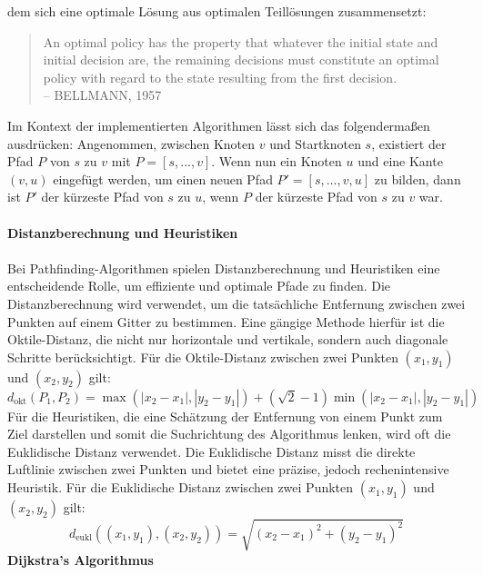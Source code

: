 \begin{itemize}
    dem sich eine optimale Lösung aus optimalen Teillösungen zusammensetzt:
    \begin{quotation}
    An optimal policy has the property that whatever the initial state and initial decision are, the remaining decisions
    must constitute an optimal policy with regard to the state resulting from the first decision.\\
    -- BELLMANN, 1957 \cite{bellman2010}
    \end{quotation}
    Im Kontext der implementierten Algorithmen lässt sich das folgendermaßen ausdrücken:
    Angenommen, zwischen Knoten $v$ und Startknoten $s$, existiert der Pfad $P$ von $s$ zu $v$ mit $P = [s, \dots, v]$.
    Wenn nun ein Knoten $u$ und eine Kante $(v, u)$ eingefügt werden, um einen neuen Pfad $P' = [s, \dots, v, u]$ zu
    bilden, dann ist $P'$ der kürzeste Pfad von $s$ zu $u$, wenn $P$ der kürzeste Pfad von $s$ zu $v$ war. \\\\
    \textbf{Distanzberechnung und Heuristiken}\\\\
    Bei Pathfinding-Algorithmen spielen Distanzberechnung und Heuristiken eine entscheidende Rolle, um effiziente und optimale Pfade zu finden.
    Die Distanzberechnung wird verwendet, um die tatsächliche Entfernung zwischen zwei Punkten auf einem Gitter zu bestimmen.
    Eine gängige Methode hierfür ist die Oktile-Distanz, die nicht nur horizontale und vertikale, sondern auch diagonale Schritte berücksichtigt.
    Für die Oktile-Distanz zwischen zwei Punkten $(x_1, y_1)$ und $(x_2, y_2)$ gilt:
    \begin{equation}
        \label{eq:distance_octile}
        d_\text{okt}(P_1, P_2) = \max(|x_2 - x_1|, |y_2 - y_1|) + ( \sqrt{2} - 1) \min(|x_2 - x_1|, |y_2 - y_1|)
    \end{equation}
    Für die Heuristiken, die eine Schätzung der Entfernung von einem Punkt zum Ziel darstellen und somit die Suchrichtung
    des Algorithmus lenken, wird oft die Euklidische Distanz verwendet.
    Die Euklidische Distanz misst die direkte Luftlinie zwischen zwei Punkten und bietet eine präzise, jedoch rechenintensive Heuristik.
    Für die Euklidische Distanz zwischen zwei Punkten $(x_1, y_1)$ und $(x_2, y_2)$ gilt:
    \begin{equation}
        \label{eq:distance_euklid}
        d_\text{eukl}((x_1, y_1), (x_2, y_2)) = \sqrt{(x_2 - x_1)^2 + (y_2 - y_1)^2}
    \end{equation}
    \textbf{Dijkstra's Algorithmus}\\

\end{itemize}
